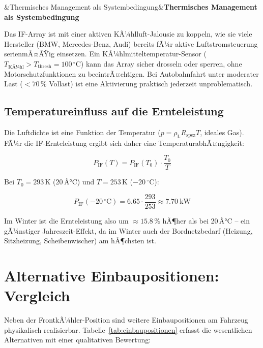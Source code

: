 ﻿\documentclass[12pt, a4paper]{report}
\newenvironment{wichtig}[1][]{%
  \begin{wichtigframe}\sloppy%
  \ifx&#1&\else\textbf{#1}\par\smallskip\fi}{\end{wichtigframe}}
\theoremstyle{definition}
\theoremstyle{remark}
\newcommand{\rhoL}{\rho_{\text{L}}}
\begin{document}
\begin{wichtig}[Thermisches Management als Systembedingung]
  Das IF-Array ist mit einer aktiven KÃ¼hlluft-Jalousie zu koppeln, wie sie
  viele Hersteller (BMW, Mercedes-Benz, Audi) bereits fÃ¼r aktive
  Luftstromsteuerung serienmÃ¤ÃŸig einsetzen. Ein KÃ¼hlmitteltemperatur-Sensor
  ($T_{\text{KÃ¼hl}} > T_{\text{thresh}} = 100\,^\circ\text{C}$) kann das Array
  sicher drosseln oder sperren, ohne Motorschutzfunktionen zu beeintrÃ¤chtigen.
  Bei Autobahnfahrt unter moderater Last ($< 70\,\%$ Vollast) ist eine
  Aktivierung praktisch jederzeit unproblematisch.
\end{wichtig}

\subsection{Temperatureinfluss auf die Ernteleistung}

Die Luftdichte ist eine Funktion der Temperatur ($p = \rhoL R_{\text{spez}} T$,
ideales Gas). FÃ¼r die IF-Ernteleistung ergibt sich daher eine TemperaturabhÃ¤ngigkeit:

\begin{equation}
  P_{\text{IF}}(T) = P_{\text{IF}}(T_0) \cdot \frac{T_0}{T}
  \label{eq:p_if_temp}
\end{equation}

Bei $T_0 = 293\,\text{K}$ (20\,Â°C) und $T = 253\,\text{K}$ ($-20\,^\circ$C):

\begin{equation}
  P_{\text{IF}}(-20\,^\circ\text{C}) = 6.65 \cdot \frac{293}{253} \approx \SI{7.70}{\kilo\watt}
  \label{eq:p_if_winter}
\end{equation}

Im Winter ist die Ernteleistung also um $\approx 15.8\,\%$ hÃ¶her als bei
20\,Â°C -- ein gÃ¼nstiger Jahreszeit-Effekt, da im Winter auch der Bordnetzbedarf
(Heizung, Sitzheizung, Scheiben\-wischer) am hÃ¶chsten ist.

\section{Alternative Einbaupositionen: Vergleich}
\label{sec:kfz_positionen}

Neben der FrontkÃ¼hler-Position sind weitere Einbaupositionen am Fahrzeug
physikalisch realisierbar. Tabelle~\ref{tab:einbaupositionen} erfasst die
wesentlichen Alternativen mit einer qualitativen Bewertung:
\end{document}
